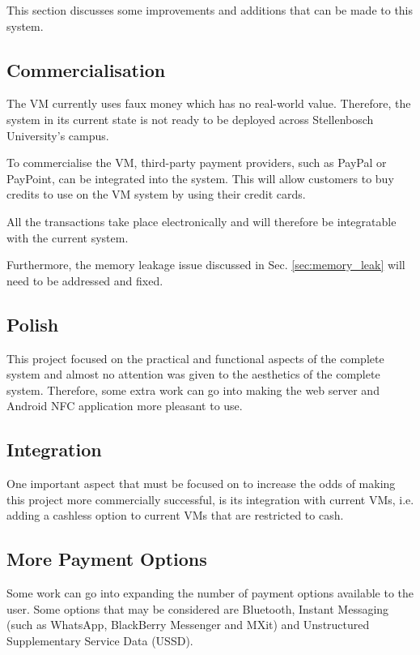 This section discusses some improvements and additions that can be made to this
system.

\subsection{Commercialisation}

The VM currently uses faux money which has no real-world value. Therefore,
the system in its current state is not ready to be deployed across Stellenbosch
University's campus. 

To commercialise the VM, third-party payment providers, such
as PayPal or PayPoint, can be integrated into the system. This will allow customers to
buy credits to use on the VM system by using their credit cards. 

All the transactions take place electronically and will therefore be integratable with the
current system. 

Furthermore, the memory leakage issue discussed in Sec. \ref{sec:memory_leak} will need
to be addressed and fixed.

\subsection{Polish}

This project focused on the practical and functional aspects of the complete system and
almost no attention was given to the aesthetics of the complete system. Therefore, some
extra work can go into making the web server and Android NFC application more pleasant to use. 

\subsection{Integration}

One important aspect that must be focused on to increase the odds of making this project
more commercially successful, is its integration with current VMs, i.e.
adding a cashless option to current VMs that are restricted to cash.

\subsection{More Payment Options}

Some work can go into expanding the number of payment options available to the user.
Some options that may be considered are Bluetooth, Instant Messaging (such as WhatsApp,
BlackBerry Messenger and MXit) and Unstructured Supplementary Service Data (USSD).